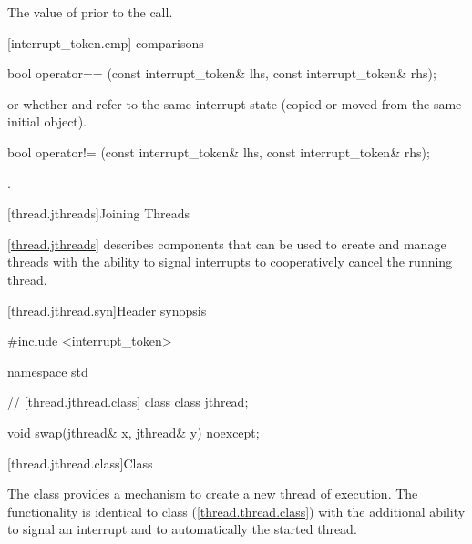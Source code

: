 {\begin{itemdescr}
  \pnum\postconditions {}

  \pnum\returns The value of  prior to the call.
\end{itemdescr}


[interrupt_token.cmp]{ comparisons}

%
\begin{itemdecl}
bool operator== (const interrupt_token& lhs, const interrupt_token& rhs);
\end{itemdecl}
\begin{itemdescr}
  \pnum\returns {} or
                whether  and  refer to the
                same interrupt state
                (copied or moved from the same initial  object).
\end{itemdescr}

%
\begin{itemdecl}
bool operator!= (const interrupt_token& lhs, const interrupt_token& rhs);
\end{itemdecl}
\begin{itemdescr}
  \pnum\returns {}.
\end{itemdescr}


\clearpage

[thread.jthreads]{Joining Threads}


\pnum
\ref{thread.jthreads} describes components that can be used to create and manage threads
with the ability to signal interrupts to cooperatively cancel the running thread.

[thread.jthread.syn]{Header  synopsis}
%

\begin{codeblock}
#include <interrupt_token>

namespace std {
  // \ref{thread.jthread.class} class 
  class jthread;

  void swap(jthread& x, jthread& y) noexcept;
}
\end{codeblock}


[thread.jthread.class]{Class }

\pnum
The class  provides a mechanism
to create a new thread of execution.
The functionality is identical to class  (\ref{thread.thread.class})
with the additional ability to signal an interrupt and to
automatically  the started thread.

}
